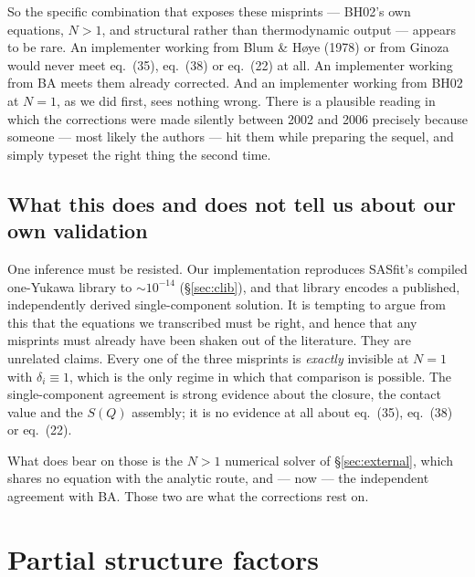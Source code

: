 \documentclass[11pt,a4paper]{article}
\newcommand{\eqBH}[1]{eq.~(#1)}
\begin{document}
So the specific combination that exposes these misprints --- BH02's own
equations, $N>1$, and structural rather than thermodynamic output --- appears to
be rare. An implementer working from Blum \& Høye (1978) or from Ginoza would
never meet \eqBH{35}, \eqBH{38} or \eqBH{22} at all. An implementer working
from BA meets them already corrected. And an implementer working from BH02 at
$N=1$, as we did first, sees nothing wrong. There is a plausible reading in
which the corrections were made silently between 2002 and 2006 precisely
because someone --- most likely the authors --- hit them while preparing the
sequel, and simply typeset the right thing the second time.

\subsection{What this does and does not tell us about our own validation}

One inference must be resisted. Our implementation reproduces SASfit's compiled
one-Yukawa library to $\sim10^{-14}$ (\S\ref{sec:clib}), and that library
encodes a published, independently derived single-component solution. It is
tempting to argue from this that the equations we transcribed must be right,
and hence that any misprints must already have been shaken out of the
literature. They are unrelated claims. Every one of the three misprints is
\emph{exactly} invisible at $N=1$ with $\delta_i\equiv1$, which is the only
regime in which that comparison is possible. The single-component agreement is
strong evidence about the closure, the contact value and the $S(Q)$ assembly;
it is no evidence at all about \eqBH{35}, \eqBH{38} or \eqBH{22}.

What does bear on those is the $N>1$ numerical solver of \S\ref{sec:external},
which shares no equation with the analytic route, and --- now --- the
independent agreement with BA. Those two are what the corrections rest on.

\section{Partial structure factors}
\label{sec:sq}
\end{document}
